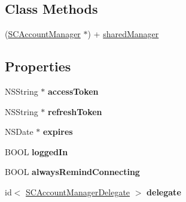 \subsection*{Class Methods}
\begin{DoxyCompactItemize}
\item 
(\hyperlink{interface_s_c_account_manager}{S\+C\+Account\+Manager} $\ast$) + \hyperlink{interface_s_c_account_manager_afd360a7ef855a4e3c237a0561340883f}{shared\+Manager}
\end{DoxyCompactItemize}
\subsection*{Properties}
\begin{DoxyCompactItemize}
\item 
N\+S\+String $\ast$ {\bfseries access\+Token}\hypertarget{interface_s_c_account_manager_aa245b5d895289a0abfe97a4737de8082}{}\label{interface_s_c_account_manager_aa245b5d895289a0abfe97a4737de8082}

\item 
N\+S\+String $\ast$ {\bfseries refresh\+Token}\hypertarget{interface_s_c_account_manager_ab312530270fff19e8d68ce52efdbc17d}{}\label{interface_s_c_account_manager_ab312530270fff19e8d68ce52efdbc17d}

\item 
N\+S\+Date $\ast$ {\bfseries expires}\hypertarget{interface_s_c_account_manager_afe5abe9821736b1ed012cd7583ee42e1}{}\label{interface_s_c_account_manager_afe5abe9821736b1ed012cd7583ee42e1}

\item 
B\+O\+OL {\bfseries logged\+In}\hypertarget{interface_s_c_account_manager_a7b036c4414d7edc9acd2f63275d9ff07}{}\label{interface_s_c_account_manager_a7b036c4414d7edc9acd2f63275d9ff07}

\item 
B\+O\+OL {\bfseries always\+Remind\+Connecting}\hypertarget{interface_s_c_account_manager_a1bf924720ad43fbef72dbe99105475ff}{}\label{interface_s_c_account_manager_a1bf924720ad43fbef72dbe99105475ff}

\item 
id$<$ \hyperlink{protocol_s_c_account_manager_delegate-p}{S\+C\+Account\+Manager\+Delegate} $>$ {\bfseries delegate}\hypertarget{interface_s_c_account_manager_a5a5811ca451c47d533f2fba6e2077791}{}\label{interface_s_c_account_manager_a5a5811ca451c47d533f2fba6e2077791}

\end{DoxyCompactItemize}


